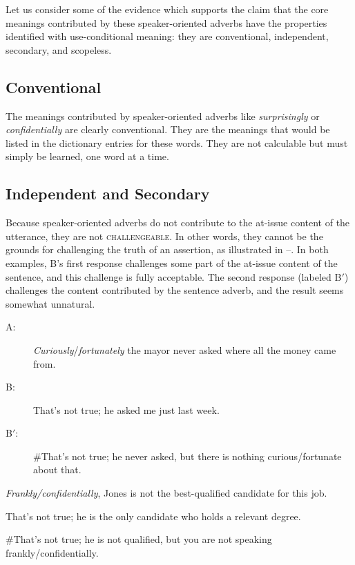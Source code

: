 Let us consider some of the evidence which supports the claim that the core meanings contributed by these speaker-oriented adverbs have the properties identified with use-conditional meaning: they are conventional, independent, secondary, and scopeless.



\subsection*{Conventional}

The meanings contributed by speaker-oriented adverbs like \textit{surprisingly} or \textit{confidentially} are clearly conventional. They are the meanings that would be listed in the dictionary entries for these words. They are not calculable but must simply be learned, one word at a time.


\subsection*{Independent and Secondary}

Because speaker-oriented adverbs do not contribute to the at-issue content of the utterance, they are not \textsc{challengeable}. In other words, they cannot be the grounds for challenging the truth of an assertion, as illustrated in –. In both examples, B’s first response challenges some part of the at-issue content of the sentence, and this challenge is fully acceptable. The second response (labeled B$'$) challenges the content contributed by the sentence adverb, and the result seems somewhat unnatural.



\ea \label{ex:11.5}
\begin{description}
\item[A:] \textit{Curiously}/\textit{fortunately} the mayor never asked where all the money came from.\\
\item[B:] That’s not true; he asked me just last week.\\
\item[B$'$:] \#That’s not true; he never asked, but there is nothing curious/fortunate about that.
\z
\end{description}


\ea \label{ex:11.6}
\begin{description}
\item[A:] \textit{Frankly/confidentially}, Jones is not the best-qualified candidate for this job.\\
\item[B:] That’s not true; he is the only candidate who holds a relevant degree.\\
\item[B$'$:] \#That’s not true; he is not qualified, but you are not speaking frankly/confidentially.\\
\item 
\z
\end{description}


